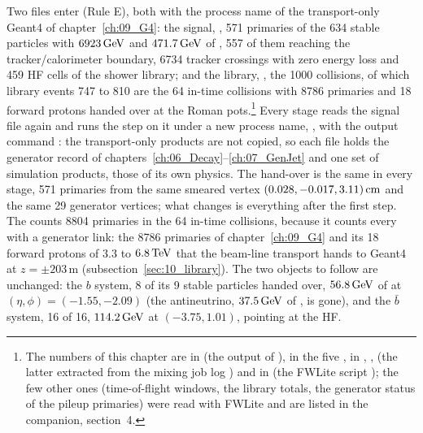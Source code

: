 Two files enter (Rule E), both with the process name  of the transport-only Geant4 of
chapter~\ref{ch:09_G4}: the signal, , 571 primaries of the 634
stable particles with $6923\,\mathrm{GeV}$ and $471.7\,\mathrm{GeV}$ of \pt{}, 557 of them reaching the tracker/calorimeter boundary,
6734 tracker crossings with zero energy loss and 459 HF cells of the shower library; and the library,
, the 1000 collisions, of which library events 747 to 810 are the 64 in-time
collisions with 8786 primaries and 18 forward protons handed over at the Roman pots.\footnote{The numbers of this chapter are in
 (the output of ), in the five
, in , ,
 (the latter extracted from the mixing job log ) and in
 (the FWLite script ); the few other ones (time-of-flight
windows, the library totals, the generator status of the pileup primaries) were read with FWLite and are listed in the
companion, section~4.} Every stage reads the signal file again and runs the
 step on it under a new process name, , with the output command :
the transport-only products are not copied, so each file holds the generator record of
chapters~\ref{ch:06_Decay}--\ref{ch:07_GenJet} and one set of simulation products, those of its own physics. The
hand-over is the same in every stage, 571 primaries from the same smeared vertex $(0.028, -0.017, 3.11)\,\mathrm{cm}$ and
the same 29 generator vertices; what changes is everything after the first step. The  counts
8804 primaries in the 64 in-time collisions, because it counts every  with a generator link:
the 8786 primaries of chapter~\ref{ch:09_G4} and its 18 forward protons of $3.3$ to $6.8\,\mathrm{TeV}$ that the beam-line
transport hands to Geant4 at $z=\pm203$\,m (subsection~\ref{sec:10_library}). The two
objects to follow are unchanged: the $b$ system, 8 of its 9 stable particles handed over, $56.8\,\mathrm{GeV}$ of \pt{} at
$(\eta,\phi) = (-1.55, -2.09)$ (the antineutrino, $37.5\,\mathrm{GeV}$ of \pt{}, is gone), and the $\bar b$ system, 16 of 16,
$114.2\,\mathrm{GeV}$ at $(-3.75, 1.01)$, pointing at the HF.

